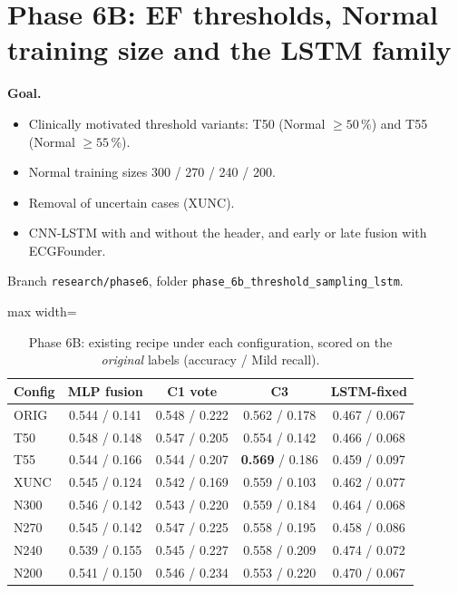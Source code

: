 \section{Phase 6B: EF thresholds, Normal training size and the LSTM family}\label{sec:p6b}
\textbf{Goal.}
\begin{itemize}
  \item Clinically motivated threshold variants: T50 (Normal $\ge50$\,\%) and T55 (Normal $\ge55$\,\%).
  \item Normal training sizes 300 / 270 / 240 / 200.
  \item Removal of uncertain cases (XUNC).
  \item CNN-LSTM with and without the header, and early or late fusion with ECGFounder.
\end{itemize}
Branch \texttt{research/phase6}, folder \texttt{phase\_6b\_threshold\_sampling\_lstm}.

\begin{table}[H]\centering\small
\caption{Phase 6B: existing recipe under each configuration, scored on the \emph{original} labels (accuracy / Mild recall).}\label{tab:p6b}
\begin{adjustbox}{max width=\linewidth}
\begin{tabular}{lcccc}\toprule
Config & MLP fusion & C1 vote & C3 & LSTM-fixed \\\midrule
ORIG & 0.544 / 0.141 & 0.548 / 0.222 & 0.562 / 0.178 & 0.467 / 0.067 \\
T50 & 0.548 / 0.148 & 0.547 / 0.205 & 0.554 / 0.142 & 0.466 / 0.068 \\
T55 & 0.544 / 0.166 & 0.544 / 0.207 & \textbf{0.569} / 0.186 & 0.459 / 0.097 \\
XUNC & 0.545 / 0.124 & 0.542 / 0.169 & 0.559 / 0.103 & 0.462 / 0.077 \\
N300 & 0.546 / 0.142 & 0.543 / 0.220 & 0.559 / 0.184 & 0.464 / 0.068 \\
N270 & 0.545 / 0.142 & 0.547 / 0.225 & 0.558 / 0.195 & 0.458 / 0.086 \\
N240 & 0.539 / 0.155 & 0.545 / 0.227 & 0.558 / 0.209 & 0.474 / 0.072 \\
N200 & 0.541 / 0.150 & 0.546 / 0.234 & 0.553 / 0.220 & 0.470 / 0.067 \\\bottomrule
\end{tabular}
\end{adjustbox}
\end{table}

